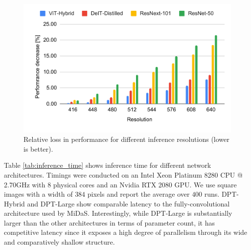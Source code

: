\documentclass[10pt,twocolumn,letterpaper]{article}
\begin{document}
\begin{figure}[t!]
  \centering
  \includegraphics[width=0.90\linewidth,trim={9mm 8mm 9mm 5mm},clip]{images/other/size_dependence}
  \caption{Relative loss in performance for different inference resolutions (lower is better).
  }
  \label{fig:inference_resolution}
\end{figure}

 Table \ref{tab:inference_time} shows inference time
for different network architectures. Timings were conducted on an Intel Xeon
Platinum 8280 CPU @ 2.70GHz with 8 physical cores and an Nvidia RTX 2080 GPU.
We use square images with a width of $384$ pixels and report the average over $400$ runs.
DPT-Hybrid and DPT-Large show comparable latency to the fully-convolutional
architecture used by MiDaS. Interestingly, while DPT-Large is substantially
larger than the other architectures in terms of parameter count, it has
competitive latency since it exposes a high degree of parallelism through its
wide and comparatively shallow structure.

\begin{table}[htb!]
  \centering
  \caption{Model statistics. DPT
  has comparable inference speed to the state of the art.}
   \label{tab:inference_time}
 \end{table}
\end{document}
